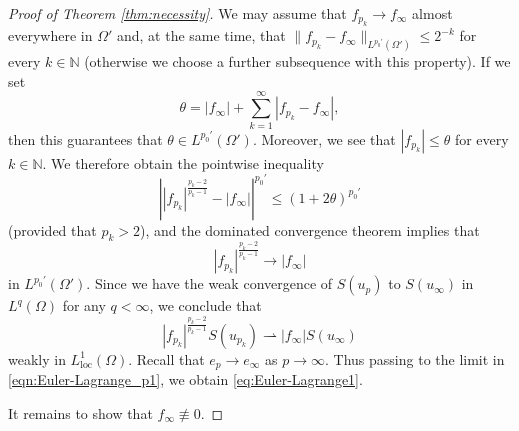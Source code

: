 \documentclass[a4paper]{article}
\newcommand{\N}{\mathbb{N}}
\newcommand{\loc}{\mathrm{loc}}
\theoremstyle{remark}
\begin{document}
\begin{proof}[Proof of Theorem \ref{thm:necessity}]
We may assume that $f_{p_k} \to f_\infty$ almost everywhere in $\Omega'$ and,
at the same time, that $\|f_{p_k} - f_\infty\|_{L^{p_0'}(\Omega')} \le 2^{-k}$
for every $k \in \N$ (otherwise we choose a further subsequence with this
property). If we set
\[
\theta = |f_\infty| + \sum_{k = 1}^\infty |f_{p_k} - f_\infty|,
\]
then this guarantees that $\theta \in L^{p_0'}(\Omega')$. Moreover, we see
that $|f_{p_k}| \le \theta$ for every $k \in \N$. We therefore obtain the pointwise inequality
\[
\left| |f_{p_k}|^{\frac{p_k - 2}{p_k - 1}} - |f_\infty| \right|^{p_0'} \le \left(1 + 2\theta\right)^{p_0'}
\]
(provided that $p_k > 2$), and the dominated convergence theorem implies that
\[
|f_{p_k}|^{\frac{p_k - 2}{p_k - 1}} \to |f_\infty|
\]
in $L^{p_0'}(\Omega')$.
Since we have the weak convergence of $S(u_p)$ to $S(u_\infty)$ in
$L^q(\Omega)$ for any $q < \infty$, we conclude that
\[
|f_{p_k}|^{\frac{p_k - 2}{p_k - 1}} S(u_{p_k}) \rightharpoonup |f_\infty| S(u_\infty)
\]
weakly in $L_\loc^1(\Omega)$. Recall that $e_p \to e_\infty$ as $p \to \infty$. Thus passing to the
limit in \eqref{eqn:Euler-Lagrange_p1}, we obtain \eqref{eq:Euler-Lagrange1}.

It remains to show that $f_\infty \not\equiv 0$.


\end{proof}
\end{document}
